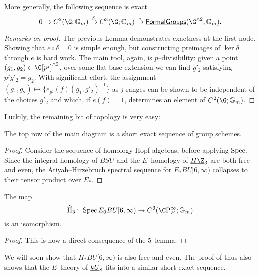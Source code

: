 \begin{lemma}
More generally, the following sequence is exact \[0 \to C^2(\G; \Gm) \xrightarrow\delta C^3(\G; \Gm) \xrightarrow{e} \InternalHom{FormalGroups}(\G^{\sm 2}, \Gm).\]
\end{lemma}
\begin{proof}[Remarks on proof]
The previous Lemma demonstrates exactness at the first node.  Showing that $e \circ \delta = 0$ is simple enough, but constructing preimages of $\ker \delta$ through $e$ is hard work.  The main tool, again, is $p$--divisibility: given a point $(g_1, g_2) \in \G[p^j]^{\sm 2}$, over some flat base extension we can find $g'_2$ satisfying $p^j g'_2 = g_2$.  With significant effort, the assignment $(g_1, g_2) \mapsto \{e_{p^j}(f)(g_1, g'_2)^{-1}\}$ as $j$ ranges can be shown to be independent of the choices $g'_2$ and which, if $e(f) = 1$, determines an element of $C^2(\G; \Gm)$.
\end{proof}

Luckily, the remaining bit of topology is very easy:

\begin{lemma}\label{ASTopologyExactSequence}
The top row of the main diagram is a short exact sequence of group schemes.
\end{lemma}
\begin{proof}
Consider the sequence of homology Hopf algebras, before applying $\operatorname{Spec}$.  Since the integral homology of $BSU$ and the $E$--homology of $\OS{H\Z}{3}$ are both free and even, the Atiyah--Hirzebruch spectral sequence for $E_* BU[6, \infty)$ collapses to their tensor product over $E_*$.
\end{proof}

\begin{corollary}
The map \[\widehat \Pi_3\co \Spec E_0 BU[6, \infty) \to C^3(\CP^\infty_E; \Gm)\] is an isomorphism.
\end{corollary}
\begin{proof}
This is now a direct consequence of the $5$--lemma.
\end{proof} 

\begin{remark}
We will soon show that $H_* BU[6, \infty)$ is also free and even.  The proof of  thus also shows that the $E$--theory of $\underline{\smash{kU}}_{8}$ fits into a similar short exact sequence.
\end{remark}

